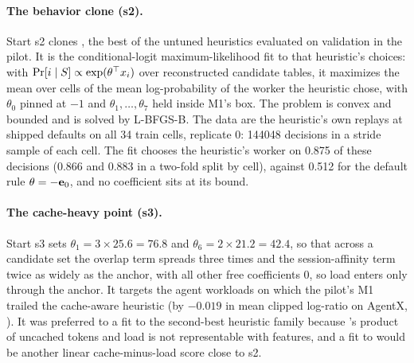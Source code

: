 \paragraph{The behavior clone (s2).}
Start s2 clones , the best of the untuned heuristics evaluated on
validation in the pilot. It is the conditional-logit maximum-likelihood fit to that heuristic's
choices: with $\Pr[i \mid S] \propto \exp(\theta^{\top}x_i)$ over reconstructed candidate
tables, it maximizes the mean over cells of the mean log-probability of the worker the heuristic
chose, with $\theta_0$ pinned at $-1$ and $\theta_1,\dots,\theta_7$ held inside M1's box. The
problem is convex and bounded and is solved by L-BFGS-B. The data are the heuristic's own replays
at shipped defaults on all 34 train cells, replicate 0: \num{144048} decisions in a stride sample
of each cell. The fit chooses the heuristic's worker on 0.875 of these decisions (0.866 and 0.883
in a two-fold split by cell), against 0.512 for the default rule $\theta = -\mathbf{e}_{0}$, and no
coefficient sits at its bound.

\paragraph{The cache-heavy point (s3).}
Start s3 sets $\theta_1 = 3 \times 25.6 = 76.8$ and $\theta_6 = 2 \times 21.2 = 42.4$, so that
across a candidate set the overlap term spreads three times and the session-affinity term twice as
widely as the anchor, with all other free coefficients 0, so load enters only through the anchor.
It targets the agent workloads on which the pilot's M1 trailed the cache-aware heuristic (by
$-0.019$ in mean clipped log-ratio on AgentX, \prelim). It was preferred to a fit to the
second-best heuristic family because 's product of uncached tokens and load is not
representable with  features, and a fit to  would be another linear
cache-minus-load score close to s2.

